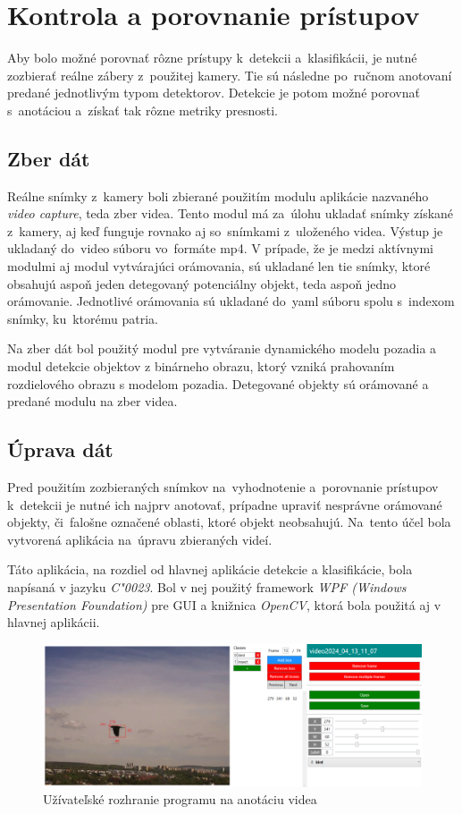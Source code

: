 \chapter{Kontrola a porovnanie prístupov}
    Aby bolo možné porovnať rôzne prístupy k~detekcii a~klasifikácii, je nutné zozbierať reálne zábery z~použitej kamery.  Tie sú následne po~ručnom anotovaní predané jednotlivým typom detektorov. Detekcie je potom možné porovnať s~anotáciou a~získať tak rôzne metriky presnosti.
    \section{Zber dát}
        Reálne snímky z~kamery boli zbierané použitím modulu aplikácie nazvaného \emph{video capture}, teda zber videa.  Tento modul má za~úlohu ukladať snímky získané z~kamery, aj keď funguje rovnako aj so~snímkami z~uloženého videa.  Výstup je ukladaný do~video súboru vo~formáte mp4. V prípade, že je medzi aktívnymi modulmi aj modul vytvárajúci orámovania, sú ukladané len tie snímky, ktoré obsahujú aspoň jeden detegovaný potenciálny objekt, teda aspoň jedno orámovanie. Jednotlivé orámovania sú ukladané do~yaml súboru spolu s~indexom snímky, ku~ktorému patria.

        Na zber dát bol použitý modul pre vytváranie dynamického modelu pozadia a modul detekcie objektov z binárneho obrazu, ktorý vzniká prahovaním rozdielového obrazu s modelom pozadia. Detegované objekty sú orámované a predané modulu na zber videa.

    \section{Úprava dát}
        Pred použitím zozbieraných snímkov na~vyhodnotenie a~porovnanie prístupov k~detekcii je nutné ich najprv anotovať, prípadne upraviť nesprávne orámované objekty, či~falošne označené oblasti, ktoré objekt neobsahujú. Na~tento účel bola vytvorená aplikácia na~úpravu zbieraných videí.

        Táto aplikácia, na rozdiel od hlavnej aplikácie detekcie a klasifikácie, bola napísaná v jazyku \emph{C\char"0023}. Bol v nej použitý framework \emph{WPF (Windows Presentation Foundation)} pre \ac{GUI} a knižnica \emph{OpenCV}, ktorá bola použitá aj v hlavnej aplikácii.

        \begin{figure}[H]
            \centering
            \includegraphics[width=\textwidth]{obrazky/video_annotator/annotation_overview.png}
            \caption{Užívateľské rozhranie programu na anotáciu videa}
        \end{figure}


